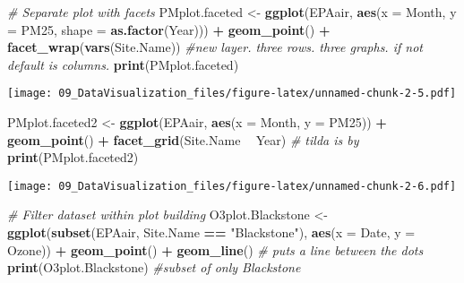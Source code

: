 \documentclass[]{article}
\newenvironment{Shaded}{\begin{snugshade}}{\end{snugshade}}
\newcommand{\KeywordTok}[1]{\textcolor[rgb]{0.13,0.29,0.53}{\textbf{#1}}}
\newcommand{\DataTypeTok}[1]{\textcolor[rgb]{0.13,0.29,0.53}{#1}}
\newcommand{\StringTok}[1]{\textcolor[rgb]{0.31,0.60,0.02}{#1}}
\newcommand{\CommentTok}[1]{\textcolor[rgb]{0.56,0.35,0.01}{\textit{#1}}}
\newcommand{\OperatorTok}[1]{\textcolor[rgb]{0.81,0.36,0.00}{\textbf{#1}}}
\newcommand{\NormalTok}[1]{#1}
\begin{document}
\begin{Shaded}
\begin{Highlighting}[]
\CommentTok{# Separate plot with facets}
\NormalTok{PMplot.faceted <-}
\StringTok{  }\KeywordTok{ggplot}\NormalTok{(EPAair, }\KeywordTok{aes}\NormalTok{(}\DataTypeTok{x =}\NormalTok{ Month, }\DataTypeTok{y =}\NormalTok{ PM25, }\DataTypeTok{shape =} \KeywordTok{as.factor}\NormalTok{(Year))) }\OperatorTok{+}
\StringTok{  }\KeywordTok{geom_point}\NormalTok{() }\OperatorTok{+}
\StringTok{  }\KeywordTok{facet_wrap}\NormalTok{(}\KeywordTok{vars}\NormalTok{(Site.Name)) }\CommentTok{#new layer. three rows. three graphs. if not default is columns.}
\KeywordTok{print}\NormalTok{(PMplot.faceted)}
\end{Highlighting}
\end{Shaded}

\texttt{[image: 09\_DataVisualization\_files/figure-latex/unnamed-chunk-2-5.pdf]}

\begin{Shaded}
\begin{Highlighting}[]
\NormalTok{PMplot.faceted2 <-}
\StringTok{  }\KeywordTok{ggplot}\NormalTok{(EPAair, }\KeywordTok{aes}\NormalTok{(}\DataTypeTok{x =}\NormalTok{ Month, }\DataTypeTok{y =}\NormalTok{ PM25)) }\OperatorTok{+}
\StringTok{  }\KeywordTok{geom_point}\NormalTok{() }\OperatorTok{+}
\StringTok{  }\KeywordTok{facet_grid}\NormalTok{(Site.Name }\OperatorTok{~}\StringTok{ }\NormalTok{Year) }\CommentTok{# tilda is by}
\KeywordTok{print}\NormalTok{(PMplot.faceted2)}
\end{Highlighting}
\end{Shaded}

\texttt{[image: 09\_DataVisualization\_files/figure-latex/unnamed-chunk-2-6.pdf]}

\begin{Shaded}
\begin{Highlighting}[]
\CommentTok{# Filter dataset within plot building}
\NormalTok{O3plot.Blackstone <-}\StringTok{ }
\StringTok{  }\KeywordTok{ggplot}\NormalTok{(}\KeywordTok{subset}\NormalTok{(EPAair, Site.Name }\OperatorTok{==}\StringTok{ "Blackstone"}\NormalTok{), }\KeywordTok{aes}\NormalTok{(}\DataTypeTok{x =}\NormalTok{ Date, }\DataTypeTok{y =}\NormalTok{ Ozone)) }\OperatorTok{+}\StringTok{ }
\StringTok{  }\KeywordTok{geom_point}\NormalTok{() }\OperatorTok{+}
\StringTok{  }\KeywordTok{geom_line}\NormalTok{() }\CommentTok{# puts a line between the dots}
\KeywordTok{print}\NormalTok{(O3plot.Blackstone) }\CommentTok{#subset of only Blackstone}
\end{Highlighting}
\end{Shaded}
\end{document}
